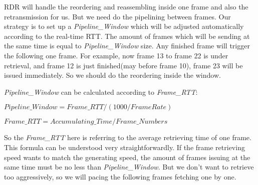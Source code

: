 RDR will handle the reordering and reassembling inside one frame and also the retransmission for us. But we need do the pipelining between frames. Our strategy is to set up a 
\textit{Pipeline\_Window} which will be adjusted automatically according to the real-time RTT. The amount of frames which will be sending at the same time is equal to \textit{Pipeline\_Window} size. Any finished frame will trigger the following one frame. For example, now frame 13 to frame 22 is under retrieval, and frame 12 is just finished(may before frame 10), frame 23 will be issued immediately. So we should do the reordering inside the window. 

\textit{Pipeline\_Window} can be calculated according to \textit{Frame\_RTT}: 

$Pipeline\_Window =  Frame\_RTT / (1000 / FrameRate) $ 

$Frame\_RTT = Accumulating\_Time / Frame\_Numbers$

So the \textit{Frame\_RTT} here is referring to the average retrieving time of one frame. This formula can be understood very straightforwardly. If the frame retrieving speed wants to match the generating speed, the amount of frames issuing at the same time must be no less than \textit{Pipeline\_Window}. But we don't want to retrieve too aggressively, so we will pacing the following frames fetching one by one.



